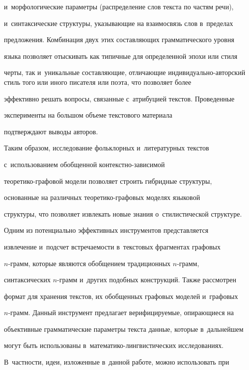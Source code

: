 и~морфологические параметры (распределение слов текста по частям речи), 


и~синтаксические структуры, указывающие на взаимосвязь слов в~пределах 


предложения. Комбинация двух этих составляющих грамматического уровня 


языка позволяет отыскивать как типичные для определенной эпохи или стиля 


черты, так и~уникальные со\-став\-ля\-ющие, отличающие ин\-ди\-ви\-ду\-аль\-но-ав\-тор\-ский стиль того или иного писателя или поэта, что позволяет более 


эффективно решать вопросы, связанные с~атрибуцией текстов. Проведенные 


эксперименты на большом объеме текстового материала~\cite{1-mos, 5-mos} 


подтверждают выводы авторов.


  


  Таким образом, исследование фольклорных и~литературных текстов 


с~использованием обобщенной кон\-текст\-но-за\-ви\-си\-мой  


тео\-ре\-ти\-ко-гра\-фо\-вой модели позволяет строить гиб\-рид\-ные структуры, 


основанные на различных тео\-ре\-ти\-ко-гра\-фо\-вых моделях языковой 


структуры, что позволяет извлекать новые знания о~стилистической структуре. 


Одним из потенциально эффективных инструментов представляется 


извлечение и~подсчет встречаемости в~текстовых фрагментах графовых  


$n$-грамм, которые являются обобщением традиционных $n$-грамм, 


синтаксических $n$-грамм и~других подобных конструкций. Также рассмотрен 


формат для хранения текстов, их обобщенных графовых моделей и~графовых  


$n$-грамм. Данный инструмент предлагает верифицируемые, опирающиеся на 


объективные грамматические параметры текста данные, которые в~дальнейшем 


могут быть использованы в~математико-лингвистических исследованиях. 


В~част\-ности, идеи, изложенные в~данной работе, можно использовать при 


